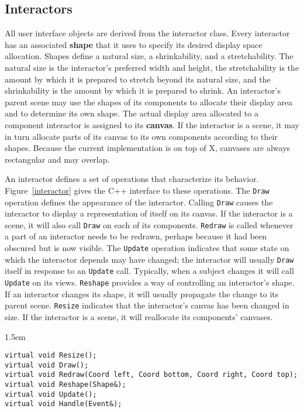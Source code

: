 \subsection{Interactors}
All user interface objects are derived from the interactor class.
Every interactor has an associated {\bf shape} that it uses to specify
its desired display space allocation.
Shapes define
a natural size, a shrinkability, and a stretchability.  The natural size is
the interactor's preferred width and height, the stretchability is the amount
by which it is prepared to stretch beyond its natural size, and
the shrinkability is the amount by which it is prepared to shrink.
An interactor's parent scene may use the shapes of its components
to allocate their display area and to determine its own shape.
The actual display area allocated to a component interactor
is assigned to its {\bf canvas}.
If the interactor is a scene, it may in turn allocate parts of its canvas
to its own components according to their shapes.
Because the current implementation is on top of X,
canvases are always rectangular and may overlap.

An interactor defines a set of operations that characterize its
behavior.  Figure~\ref{interactor} gives the C++ interface to
these operations.
The {\tt Draw} operation defines the appearance of the
interactor.  Calling {\tt Draw} causes the interactor to display a
representation of itself on its canvas.  If the interactor is a scene, it
will also call {\tt Draw} on each of its components.
{\tt Redraw} is called
whenever a part of an interactor needs to be redrawn,
perhaps because it had been obscured but is now visible.
The {\tt Update} operation indicates that some state on which the
interactor depends may have changed; the interactor will usually {\tt Draw}
itself in response to an {\tt Update} call.
Typically, when a subject changes it will call {\tt Update} on its views.
{\tt Reshape} provides a way of controlling an interactor's shape.  If an
interactor changes its shape, it will usually propagate the change to its
parent scene.
{\tt Resize} indicates that the interactor's canvas has been
changed in size.  If the interactor is a scene, it will reallocate its
components' canvases.

\begin{figure*}
\begin{code}{1.5em}
\begin{verbatim}
virtual void Resize();
virtual void Draw();
virtual void Redraw(Coord left, Coord bottom, Coord right, Coord top);
virtual void Reshape(Shape&);
virtual void Update();
virtual void Handle(Event&);
\end{verbatim}
\end{code}
\vspace{1ex}
\caption{Interface to Interactor base class operations}
\label{interactor}
\end{figure*}

